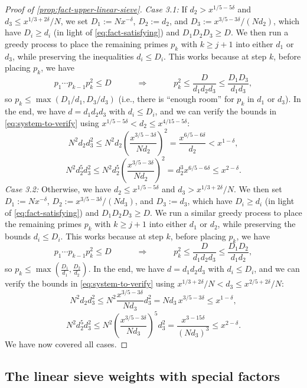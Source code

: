 \documentclass[reqno,11pt]{amsart}
\theoremstyle{remark}
\numberwithin{equation}{section}
\begin{document}
\begin{proof}[Proof of \cref{prop:fact-upper-linear-sieve}]
\emph{Case 3.1:} If $d_2 > x^{1/5 - 5\delta}$ and $d_3 \le x^{1/3+2\delta}/N$, we set $D_1 := Nx^{-\delta}$, $D_2 := d_2$, and $D_3 := x^{3/5 - 3\delta}/(Nd_2)$, which have $D_i \ge d_i$ (in light of \cref{eq:fact-satisfying}) and $D_1 D_2 D_3 \ge D$. We then run a greedy process to place the remaining primes $p_k$ with $k \ge j+1$ into either $d_1$ or $d_3$, while preserving the inequalities $d_i \le D_i$. This works because at step $k$, before placing $p_k$, we have
\[
    p_1 \cdots p_{k-1} p_k^2 \le D
    \qquad\quad 
    \Rightarrow 
    \qquad\quad
    p_k^2 \le \frac{D}{d_1 d_2 d_3} \le \frac{D_1 D_3}{d_1 d_3},
\]
so $p_k \le \max(D_1/d_1, D_3/d_3)$ (i.e., there is ``enough room'' for $p_k$ in $d_1$ or $d_3$). In the end, we have $d = d_1 d_2 d_3$ with $d_i \le D_i$, and we can verify the bounds in \cref{eq:system-to-verify} using $x^{1/5 - 5\delta} < d_2 \le x^{4/15-5\delta}$:
\[
    N^2 d_2 d_3^2 \le N^2 d_2 \left(\frac{x^{3/5-3\delta}}{Nd_2}\right)^2 = 
    \frac{x^{6/5 - 6\delta}}{d_2}
    <
    x^{1-\delta},
\]
\[
    N^2 d_2^5 d_3^2 \le N^2 d_2^5 \left(\frac{x^{3/5-3\delta}}{Nd_2}\right)^2 = d_2^3 x^{6/5-6\delta} \le x^{2-\delta}.
\]
\emph{Case 3.2:} Otherwise, we have $d_2 \le x^{1/5-5\delta}$ and $d_3 > x^{1/3+2\delta}/N$. We then set $D_1 := N x^{-\delta}$, $D_2 := x^{3/5-3\delta}/(Nd_3)$, and $D_3 := d_3$, which have $D_i \ge d_i$ (in light of \cref{eq:fact-satisfying}) and $D_1 D_2 D_3 \ge D$. We run a similar greedy process to place the remaining primes $p_k$ with $k \ge j+1$ into either $d_1$ or $d_2$, while preserving the bounds $d_i \le D_i$. This works because at step $k$, before placing $p_k$, we have
\[
    p_1 \cdots p_{k-1} p_k^2 \le D
    \qquad\quad 
    \Rightarrow 
    \qquad\quad
    p_k^2 \le \frac{D}{d_1 d_2 d_3} \le \frac{D_1 D_2}{d_1 d_2},
\]
so $p_k \le \max(\frac{D_1}{d_1}, \frac{D_2}{d_2})$. In the end, we have $d = d_1 d_2 d_3$ with $d_i \le D_i$, and we can verify the bounds in \cref{eq:system-to-verify} using $x^{1/3 + 2\delta}/N < d_3 \le x^{2/5 + 2\delta}/N$:
\[
    N^2 d_2 d_3^2 \le N^2 \frac{x^{3/5-3\delta}}{Nd_3} d_3^2 = 
    N d_3\, x^{3/5 - 3\delta}
    \le
    x^{1-\delta},
\]
\[
    N^2 d_2^5 d_3^2 \le N^2 \left(\frac{x^{3/5-3\delta}}{Nd_3}\right)^5 d_3^2 = \frac{x^{3-15\delta}}{(Nd_3)^3} \le x^{2-\delta}.
\]
We have now covered all cases.
\end{proof}


\subsection{The linear sieve weights with special factors} \label{subsec:linear-sieve-special-factors}
\end{document}
